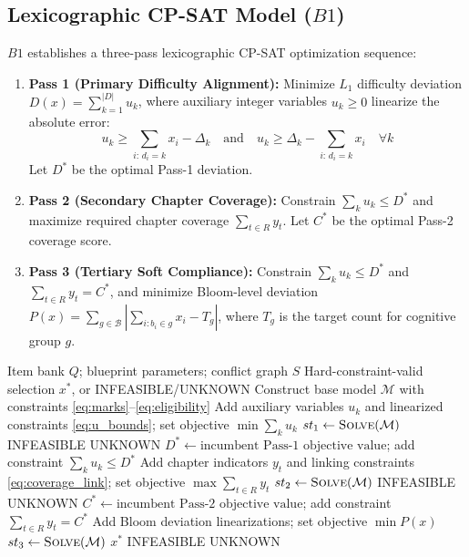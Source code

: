 \documentclass[runningheads]{llncs}
\begin{document}
\subsection{Lexicographic CP-SAT Model ($B1$)}
$B1$ establishes a three-pass lexicographic CP-SAT optimization sequence:
\begin{enumerate}\setlength{\itemsep}{1pt}\setlength{\parskip}{0pt}
    \item \textbf{Pass 1 (Primary Difficulty Alignment):} Minimize $L_1$ difficulty deviation $D(x) = \sum_{k=1}^{|D|} u_k$, where auxiliary integer variables $u_k \ge 0$ linearize the absolute error:
    \begin{equation}
    u_k \ge \sum_{i:\,d_i=k} x_i - \Delta_k \quad \text{and} \quad u_k \ge \Delta_k - \sum_{i:\,d_i=k} x_i \quad \forall k \label{eq:u_bounds}
    \end{equation}
    Let $D^*$ be the optimal Pass-1 deviation.
    \item \textbf{Pass 2 (Secondary Chapter Coverage):} Constrain $\sum_k u_k \le D^*$ and maximize required chapter coverage $\sum_{t\in R} y_t$. Let $C^*$ be the optimal Pass-2 coverage score.
    \item \textbf{Pass 3 (Tertiary Soft Compliance):} Constrain $\sum_k u_k \le D^*$ and $\sum_{t\in R} y_t = C^*$, and minimize Bloom-level deviation $P(x) = \sum_{g\in\mathcal{B}} | \sum_{i:b_i\in g} x_i - T_g |$, where $T_g$ is the target count for cognitive group $g$.
\end{enumerate}

\begin{algorithm}[t]
\caption{Three-pass lexicographic CP-SAT solver ($B1$)}
\label{alg:threepass}
\begin{algorithmic}[1]
\Require Item bank $Q$; blueprint parameters; conflict graph $S$
\Ensure Hard-constraint-valid selection $x^*$, or INFEASIBLE/UNKNOWN
\State Construct base model $\mathcal{M}$ with constraints \eqref{eq:marks}--\eqref{eq:eligibility}
\State Add auxiliary variables $u_k$ and linearized constraints \eqref{eq:u_bounds}; set objective $\min \sum_k u_k$
\State $st_1 \gets \textsc{Solve}(\mathcal{M})$
 \Return INFEASIBLE \EndIf
{} \Return UNKNOWN \EndIf
\State $D^* \gets \text{incumbent Pass-1 objective value}$; add constraint $\sum_k u_k \le D^*$
\State Add chapter indicators $y_t$ and linking constraints \eqref{eq:coverage_link}; set objective $\max \sum_{t\in R} y_t$
\State $st_2 \gets \textsc{Solve}(\mathcal{M})$
 \Return INFEASIBLE \EndIf
{} \Return UNKNOWN \EndIf
\State $C^* \gets \text{incumbent Pass-2 objective value}$; add constraint $\sum_{t\in R} y_t = C^*$
\State Add Bloom deviation linearizations; set objective $\min P(x)$
\State $st_3 \gets \textsc{Solve}(\mathcal{M})$
 \Return $x^*$ \EndIf
{} \Return INFEASIBLE \EndIf
\Return UNKNOWN
\end{algorithmic}
\end{algorithm}
\end{document}
